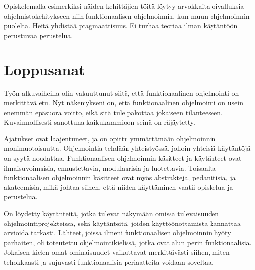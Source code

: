 Opiskelemalla esimerkiksi näiden kehittäjien töitä löytyy arvokkaita oivalluksia ohjelmistokehitykseen niin funktionaalisen ohjelmoinnin, kun muun ohjelmoinnin puolelta. Heitä yhdistää pragmaattisuus. Ei turhaa teoriaa ilman käytäntöön perustuvaa perustelua.

\section{Loppusanat}

Työn alkuvaiheilla olin vakuuttunut siitä, että funktionaalinen ohjelmointi on merkittävä etu. Nyt näkemykseni on, että funktionaalinen ohjelmointi on usein enemmän epäsuora voitto, eikä sitä tule pakottaa jokaiseen tilanteeseen. Kuvainnollisesti sanottuna kaikukammioon seinä on räjäytetty.

Ajatukset ovat laajentuneet, ja on opittu ymmärtämään ohjelmoinnin monimuotoisuutta. Ohjelmointia tehdään yhteistyössä, jolloin yhteisiä käytäntöjä on syytä noudattaa. Funktionaalisen ohjelmoinnin käsitteet ja käytänteet ovat ilmaisuvoimaisia, ennustettavia, modulaarisia ja luotettavia. Toisaalta funktionaalisen ohjelmoinnin käsitteet ovat myös abstrakteja, pedanttisia, ja akateemisia, mikä johtaa siihen, että niiden käyttäminen vaatii opiskelua ja perustelua.

On löydetty käytänteitä, jotka tulevat näkymään omissa tulevaisuuden ohjelmointiprojekteissa, sekä käytänteitä, joiden käyttöönottamista kannattaa arvioida tarkasti. Lähteet, joissa ilmeni funktionaalisen ohjelmoinnin hyöty parhaiten, oli toteutettu ohjelmointikielissä, jotka ovat alun perin funktionaalisia. Jokaisen kielen omat ominaisuudet vaikuttavat merkittävästi siihen, miten tehokkaasti ja sujuvasti funktionaalisia periaatteita voidaan soveltaa.


